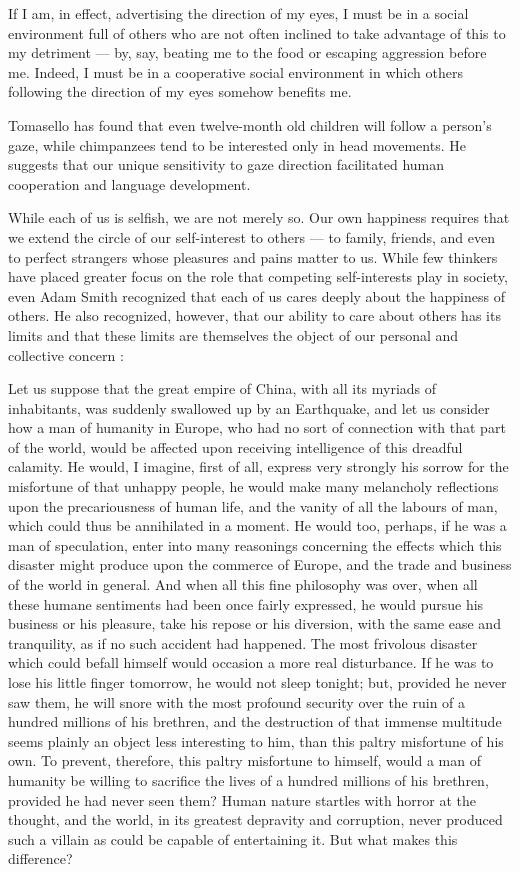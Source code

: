 \documentclass[a4paper,14pt]{extbook}
\begin{document}
If I am, in effect, advertising the direction of my eyes, I must be in a social environment full of others who are not often inclined to take advantage of this to my detriment --- by, say, beating me to the food or escaping aggression before me.
Indeed, I must be in a cooperative social environment in which others following the direction of my eyes somehow benefits me.

Tomasello has found that even twelve-month old children will follow a person's gaze, while chimpanzees tend to be interested only in head movements.
He suggests that our unique sensitivity to gaze direction facilitated human cooperation and language development.

While each of us is selfish, we are not merely so.
Our own happiness requires that we extend the circle of our self-interest to others --- to family, friends, and even to perfect strangers whose pleasures and pains matter to us.
While few thinkers have placed greater focus on the role that competing self-interests play in society, even Adam Smith recognized that each of us cares deeply about the happiness of others.
He also recognized, however, that our ability to care about others has its limits and that these limits are themselves the object of our personal and collective concern :

Let us suppose that the great empire of China, with all its myriads of inhabitants, was suddenly swallowed up by an Earthquake, and let us consider how a man of humanity in Europe, who had no sort of connection with that part of the world, would be affected upon receiving intelligence of this dreadful calamity.
He would, I imagine, first of all, express very strongly his sorrow for the misfortune of that unhappy people, he would make many melancholy reflections upon the precariousness of human life, and the vanity of all the labours of man, which could thus be annihilated in a moment.
He would too, perhaps, if he was a man of speculation, enter into many reasonings concerning the effects which this disaster might produce upon the commerce of Europe, and the trade and business of the world in general.
And when all this fine philosophy was over, when all these humane sentiments had been once fairly expressed, he would pursue his business or his pleasure, take his repose or his diversion, with the same ease and tranquility, as if no such accident had happened.
The most frivolous disaster which could befall himself would occasion a more real disturbance.
If he was to lose his little finger tomorrow, he would not sleep tonight;
but, provided he never saw them, he will snore with the most profound security over the ruin of a hundred millions of his brethren, and the destruction of that immense multitude seems plainly an object less interesting to him, than this paltry misfortune of his own.
To prevent, therefore, this paltry misfortune to himself, would a man of humanity be willing to sacrifice the lives of a hundred millions of his brethren, provided he had never seen them?
Human nature startles with horror at the thought, and the world, in its greatest depravity and corruption, never produced such a villain as could be capable of entertaining it.
But what makes this difference?
\end{document}
